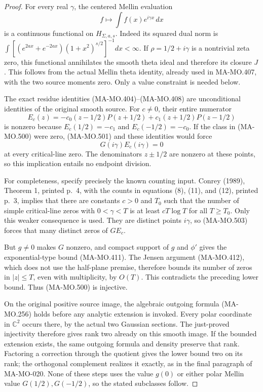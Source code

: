 \begin{proof}
For every real \(\gamma\), the centered Mellin evaluation
\[
              f\longmapsto\int f(x)e^{i\gamma x}\,dx
 \tag{MA-MO.501}
\]
is a continuous functional on \(H_{\Sigma,a,s}\).
Indeed its squared dual norm is
\(\int[(e^{2ax}+e^{-2ax})(1+x^2)^{s/2}]^{-1}dx<\infty\).
If \(\rho=1/2+i\gamma\) is a nontrivial zeta zero, this
functional annihilates the smooth theta ideal and therefore
its closure \(J\). This follows from the actual Mellin
theta identity, already used in MA-MO.407, with the two
source moments zero. Only a value constraint is needed below.

The exact residue identities (MA-MO.404)--(MA-MO.408)
are unconditional identities of the original smooth source.
For \(c\ne0\), their entire numerator
\[
 E_c(z)=-c_0(z-1/2)P(z+1/2)+c_1(z+1/2)P(z-1/2)
 \tag{MA-MO.502}
\]
is nonzero because \(E_c(1/2)=-c_1\) and
\(E_c(-1/2)=-c_0\). If the class in (MA-MO.500)
were zero, (MA-MO.501) and these identities would force
\[
                    G(i\gamma)E_c(i\gamma)=0
 \tag{MA-MO.503}
\]
at every critical-line zero. The denominators
\(z\pm1/2\) are nonzero at these points, so this
implication entails no endpoint division.

For completeness, specify precisely the known counting
input. Conrey (1989), Theorem 1, printed p.~4, with the
counts in equations (8), (11), and (12), printed p.~3,
implies that there are constants \(c>0\) and \(T_0\)
such that the number of simple critical-line zeros with
\(0<\gamma<T\) is at least \(cT\log T\) for all
\(T\ge T_0\). Only this weaker consequence is used.
They are distinct points \(i\gamma\), so (MA-MO.503)
forces that many distinct zeros of \(GE_c\).

But \(g\ne0\) makes \(G\) nonzero, and compact support
of \(g\) and \(\phi'\) gives the exponential-type bound
(MA-MO.411). The Jensen argument (MA-MO.412), which does
not use the half-plane premise, therefore bounds its number
of zeros in \(|z|\le T\), even with multiplicity, by
\(O(T)\). This contradicts the preceding lower bound.
Thus (MA-MO.500) is injective.

On the original positive source image, the algebraic
outgoing formula (MA-MO.256) holds before any analytic
extension is invoked. Every polar coordinate in
\(\mathbb C^2\) occurs there, by the actual two Gaussian
sections. The just-proved injectivity therefore gives rank
two already on this smooth image. If the bounded extension
exists, the same outgoing formula and density preserve that
rank. Factoring a correction through the quotient gives
the lower bound two on its rank; the orthogonal complement
realizes it exactly, as in the final paragraph of MA-MO-020.
None of these steps uses the value \(g(0)\) or either
polar Mellin value \(G(1/2),G(-1/2)\), so the stated
subclasses follow.
\end{proof}

